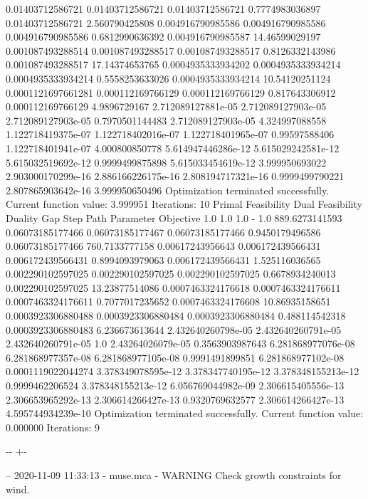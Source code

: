 \documentclass[letterpaper,10pt,english]{sphinxmanual}
\newlength\nbsphinxcodecellspacing
\begin{document}
{\begin{sphinxVerbatim}[commandchars=\\\{\}]
0.01403712586721    0.01403712586721    0.01403712586721    0.7774983036897  0.01403712586721    2.560790425808
0.004916790985586   0.004916790985586   0.004916790985586   0.6812990636392  0.004916790985587   14.46599029197
0.001087493288514   0.001087493288517   0.001087493288517   0.8126332143986  0.001087493288517   17.14374653765
0.0004935333934202  0.0004935333934214  0.0004935333934214  0.5558253633026  0.0004935333934214  10.54120251124
0.0001121697661281  0.000112169766129   0.000112169766129   0.817643306912   0.000112169766129   4.9896729167
2.712089127881e-05  2.712089127903e-05  2.712089127903e-05  0.7970501144483  2.712089127903e-05  4.324997088558
1.122718419375e-07  1.122718402016e-07  1.122718401965e-07  0.99597588406    1.122718401941e-07  4.000800850778
5.614947446286e-12  5.615029242581e-12  5.615032519692e-12  0.9999499875898  5.615033454619e-12  3.999950693022
2.903000170299e-16  2.886166226175e-16  2.808194717321e-16  0.9999499790221  2.807865903642e-16  3.999950650496
Optimization terminated successfully.
         Current function value: 3.999951
         Iterations: 10
Primal Feasibility  Dual Feasibility    Duality Gap         Step             Path Parameter      Objective
1.0                 1.0                 1.0                 -                1.0                 889.6273141593
0.06073185177466    0.06073185177467    0.06073185177466    0.9450179496586  0.06073185177466    760.7133777158
0.00617243956643    0.006172439566431   0.006172439566431   0.8994093979063  0.006172439566431   1.525116036565
0.002290102597025   0.002290102597025   0.002290102597025   0.6678934240013  0.002290102597025   13.23877514086
0.0007463324176618  0.0007463324176611  0.0007463324176611  0.7077017235652  0.0007463324176608  10.86935158651
0.0003923306880488  0.0003923306880484  0.0003923306880484  0.488114542318   0.0003923306880483  6.236673613644
2.432640260798e-05  2.432640260791e-05  2.432640260791e-05  1.0              2.43264026079e-05   0.3563903987643
6.281868977076e-08  6.281868977357e-08  6.281868977105e-08  0.9991491899851  6.281868977102e-08  0.0001119022044274
3.378349078595e-12  3.378347740195e-12  3.378348155213e-12  0.9999462206524  3.378348155213e-12  6.056769044982e-09
2.306615405556e-13  2.306653965292e-13  2.306614266427e-13  0.9320769632577  2.306614266427e-13  4.595744934239e-10
Optimization terminated successfully.
         Current function value: 0.000000
         Iterations: 9
\end{sphinxVerbatim}
}

{

\kern-\sphinxverbatimsmallskipamount\kern-\baselineskip
\kern+\FrameHeightAdjust\kern-\fboxrule
\vspace{\nbsphinxcodecellspacing}

\begin{sphinxVerbatim}[commandchars=\\\{\}]
-- 2020-11-09 11:33:13 - muse.mca - WARNING
Check growth constraints for wind.

\end{sphinxVerbatim}
}
\end{document}
